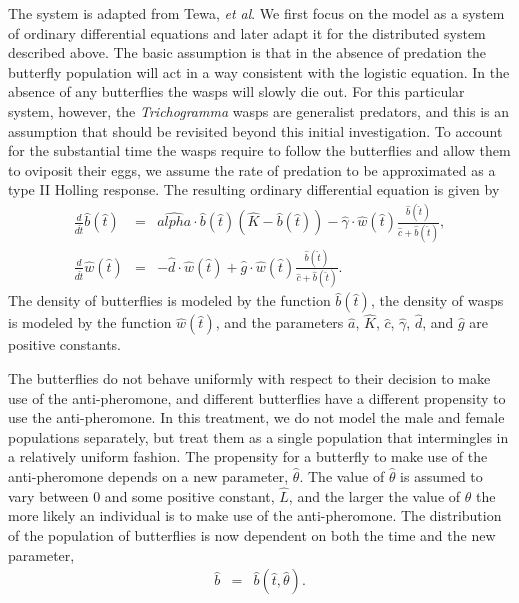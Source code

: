 \documentclass[review]{elsarticle}
\def\alpha{alpha}%
\newcommand{\origB}{\hat{b}}
\newcommand{\origW}{\hat{w}}
\newcommand{\origAlpha}{\hat{\alpha}}
\newcommand{\origK}{\hat{K}}
\newcommand{\origGamma}{\hat{\gamma}}
\newcommand{\origA}{\hat{a}}
\newcommand{\origC}{\hat{c}}
\newcommand{\origD}{\hat{d}}
\newcommand{\origG}{\hat{g}}
\newcommand{\origL}{\hat{L}}
\newcommand{\origTheta}{\hat{\theta}}
\newcommand{\origT}{\hat{t}}
\begin{document}
The system is adapted from Tewa, \textit{et al}\cite{TEWA20134825}. We
first focus on the model as a system of ordinary differential
equations and later adapt it for the distributed system described
above. The basic assumption is that in the absence of predation the
butterfly population will act in a way consistent with the logistic
equation. In the absence of any butterflies the wasps will slowly die
out. For this particular system, however, the \textit{Trichogramma}
wasps are generalist predators, and this is an assumption that should
be revisited beyond this initial investigation.  To account for the
substantial time the wasps require to follow the butterflies and allow
them to oviposit their eggs, we assume the rate of predation to be
approximated as a type II Holling response\cite{TEWA20134825}.  The
resulting ordinary differential equation is given by
\begin{eqnarray}
  \label{eq:initialSystem1}
  \frac{d}{d\origT} \origB(\origT) & = & \origAlpha \cdot \origB(\origT) (\origK - \origB(\origT))
                               - \origGamma \cdot \origW(\origT) \frac{\origB(\origT)}{\origC+\origB(\origT)}, \\
  \label{eq:initialSystem2}
  \frac{d}{d\origT} \origW(\origT) & = & -\origD \cdot \origW(\origT) + \origG \cdot \origW(\origT) \frac{\origB(\origT)}{\origC+\origB(\origT)}.
\end{eqnarray}
The density of butterflies is modeled by the function
$\origB(\origT)$, the density of wasps is modeled by the function
$\origW(\origT)$, and the parameters $\origA$, $\origK$, $\origC$,
$\origGamma$, $\origD$, and $\origG$ are positive constants.

The butterflies do not behave uniformly with respect to their decision
to make use of the anti-pheromone, and different butterflies have a
different propensity to use the anti-pheromone. In this treatment, we
do not model the male and female populations separately, but treat
them as a single population that intermingles in a relatively uniform
fashion. The propensity for a butterfly to make use of the
anti-pheromone depends on a new parameter, $\origTheta$. The value of
$\origTheta$ is assumed to vary between $0$ and some positive constant,
$\origL$, and the larger the value of $\origTheta$ the more likely an
individual is to make use of the anti-pheromone. The distribution of
the population of butterflies is now dependent on both the time and
the new parameter,
\begin{eqnarray}
  \origB & = & \origB(\origT,\origTheta).
\end{eqnarray}
\end{document}
